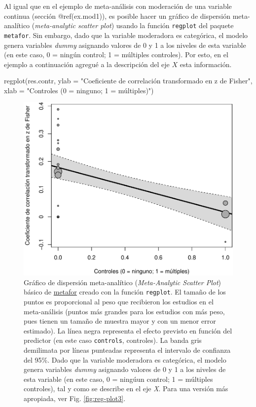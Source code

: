 \documentclass[
  bookmarksnumbered]{article}
\newenvironment{Shaded}{\begin{snugshade}}{\end{snugshade}}
\newcommand{\AttributeTok}[1]{\textcolor[rgb]{0.00,0.34,0.68}{#1}}
\newcommand{\FunctionTok}[1]{\textcolor[rgb]{0.39,0.29,0.61}{#1}}
\newcommand{\NormalTok}[1]{\textcolor[rgb]{0.12,0.11,0.11}{#1}}
\newcommand{\StringTok}[1]{\textcolor[rgb]{0.75,0.01,0.01}{#1}}
\begin{document}
Al igual que en el ejemplo de meta-análisis con moderación de una variable continua (sección @ref(ex.mod1)), es posible hacer un gráfico de dispersión meta-analítico (\emph{meta-analytic scatter plot}) usando la función \texttt{regplot} del paquete \texttt{metafor}. Sin embargo, dado que la variable moderadora es categórica, el modelo genera variables \emph{dummy} asignando valores de 0 y 1 a los niveles de esta variable (en este caso, 0 = ningún control; 1 = múltiples controles). Por esto, en el ejemplo a continuación agregué a la descripción del eje \(X\) esta información.

\begin{Shaded}
\begin{Highlighting}[]
\FunctionTok{regplot}\NormalTok{(res.contr,}
        \AttributeTok{ylab =} \StringTok{"Coeficiente de correlación transformado en z de Fisher"}\NormalTok{,}
        \AttributeTok{xlab =} \StringTok{"Controles (0 = ninguno; 1 = múltiples)"}\NormalTok{)}
\end{Highlighting}
\end{Shaded}

\begin{figure}
\centering
\includegraphics{Meta-analysis_files/figure-latex/reg-plot2-1.pdf}
\caption{\label{fig:reg-plot2}Gráfico de dispersión meta-analítico (\emph{Meta-Analytic Scatter Plot}) básico de \href{https://www.metafor-project.org/doku.php}{metafor} creado con la función \texttt{regplot}. El tamaño de los puntos es proporcional al peso que recibieron los estudios en el meta-análisis (puntos más grandes para los estudios con más peso, pues tienen un tamaño de muestra mayor y con un menor error estimado). La línea negra representa el efecto previsto en función del predictor (en este caso \texttt{controls}, controles). La banda gris demilimata por líneas punteadas representa el intervalo de confianza del 95\%. Dado que la variable moderadora es categórica, el modelo genera variables \emph{dummy} asignando valores de 0 y 1 a los niveles de esta variable (en este caso, 0 = ningúun control; 1 = múltiples controles), tal y como se describe en el eje \emph{X}. Para una versión más apropiada, ver Fig. \ref{fig:reg-plot3}.}
\end{figure}
\end{document}
